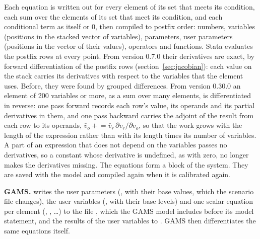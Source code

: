 Each equation is written out for every element of its set that meets its
condition, each sum over the elements of its set that meet its condition, and
each conditional term as itself or 0, then compiled to postfix order: numbers, variables
(positions in the stacked vector of variables), parameters, user parameters
(positions in the vector of their values), operators and functions. Stata evaluates the postfix rows at every point. From version
0.7.0 their derivatives are exact, by forward differentiation of the postfix
rows (section~\ref{sec:jacobian}): each value on the stack carries its
derivatives with respect to the variables that the element uses. Before, they
were found by grouped differences. From version 0.30.0 an element of 200
variables or more, as a sum over many elements, is differentiated in
reverse: one pass forward records each row's value, its operands and its
partial derivatives in them, and one pass backward carries the adjoint of
the result from each row to its operands, $\bar v_o \mathrel{+}= \bar v_r\,
\partial v_r/\partial v_o$, so that the work grows with the length of the
expression rather than with its length times its number of variables. A part
of an expression that does not depend on the variables passes no
derivatives, so a constant whose derivative is undefined, as
 with  zero, no longer makes the derivatives
missing. The equations form a block  of the
system. They are saved with the model
and compiled again when it is calibrated again.

\textbf{GAMS.}  writes the user parameters (,
with their base values, which the scenario file changes), the user variables
(, with their base levels) and one scalar equation per element (,
, \dots) to the file , which the GAMS model includes
before its model statement, and the results of the user variables to
. GAMS then differentiates the same equations itself.
